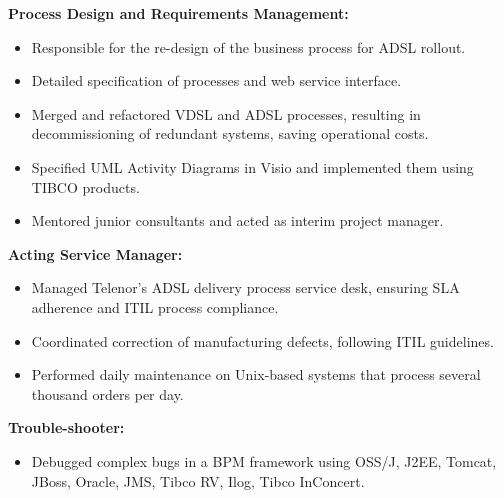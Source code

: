 \documentclass[11pt,a4paper,sans]{moderncv}
\begin{document}
{
    \textbf{Process Design and Requirements Management:}
    \begin{itemize}
        \item Responsible for the re-design of the business process for ADSL rollout.
        \item Detailed specification of processes and web service interface.
        \item Merged and refactored VDSL and ADSL processes, resulting in decommissioning of redundant systems, saving operational costs.
        \item Specified UML Activity Diagrams in Visio and implemented them using TIBCO products.
        \item Mentored junior consultants and acted as interim project manager.
    \end{itemize}

    \textbf{Acting Service Manager:}
    \begin{itemize}
        \item Managed Telenor's ADSL delivery process service desk, ensuring SLA adherence and ITIL process compliance.
        \item Coordinated correction of manufacturing defects, following ITIL guidelines.
        \item Performed daily maintenance on Unix-based systems that process several thousand orders per day.
    \end{itemize}

    \textbf{Trouble-shooter:}
    \begin{itemize}
        \item Debugged complex bugs in a BPM framework using OSS/J, J2EE, Tomcat, JBoss, Oracle, JMS, Tibco RV, Ilog, Tibco InConcert.
    \end{itemize}
}
\end{document}
